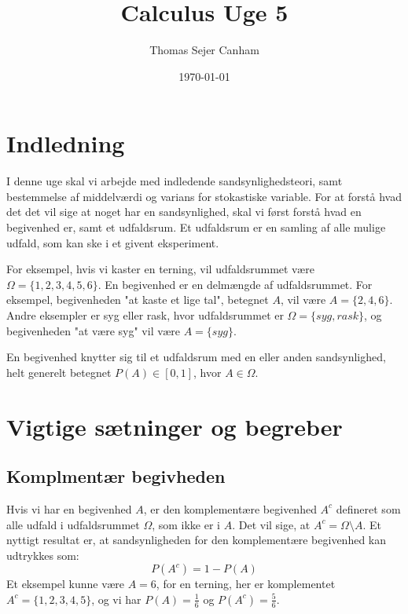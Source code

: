 \documentclass{article}
\title{Calculus Uge 5}
\author{Thomas Sejer Canham}
\date{\today}
\begin{document}
\begin{titlepage}
 \maketitle
 \thispagestyle{empty}
\end{titlepage}
\section*{Indledning}
I denne uge skal vi arbejde med indledende sandsynlighedsteori, samt bestemmelse af middelværdi og varians for stokastiske variable. For at forstå hvad det det vil sige at noget har en sandsynlighed, skal vi først forstå hvad en begivenhed er, samt et udfaldsrum. Et udfaldsrum er en samling af alle mulige udfald, som kan ske i et givent eksperiment. \vspace{1em}

For eksempel, hvis vi kaster en terning, vil udfaldsrummet være $ \Omega= \{1, 2, 3, 4, 5, 6\}$. En begivenhed er en delmængde af udfaldsrummet. For eksempel, begivenheden "at kaste et lige tal", betegnet $A$, vil være $ A = \{2, 4, 6\}$. Andre eksempler er syg eller rask, hvor udfaldsrummet er $ \Omega = \{syg, rask\}$, og begivenheden "at være syg" vil være $ A = \{syg\}$. \vspace{1em}

En begivenhed knytter sig til et udfaldsrum med en eller anden sandsynlighed, helt generelt betegnet $P(A) \in [0, 1]$, hvor $A \in \Omega$.

\section*{Vigtige sætninger og begreber}

\subsection*{Komplmentær begivheden}
Hvis vi har en begivenhed $A$, er den komplementære begivenhed $A^c$ defineret som alle udfald i udfaldsrummet $\Omega$, som ikke er i $A$. Det vil sige, at $A^c = \Omega \setminus A$. Et nyttigt resultat er, at sandsynligheden for den komplementære begivenhed kan udtrykkes som:
\begin{equation}
P(A^c) = 1 - P(A)
\end{equation}
Et eksempel kunne være $A=6$, for en terning, her er komplementet $A^c = \{1, 2, 3, 4, 5\}$, og vi har $P(A) = \frac{1}{6}$ og $P(A^c) = \frac{5}{6}$. \vspace{1em}
\end{document}
